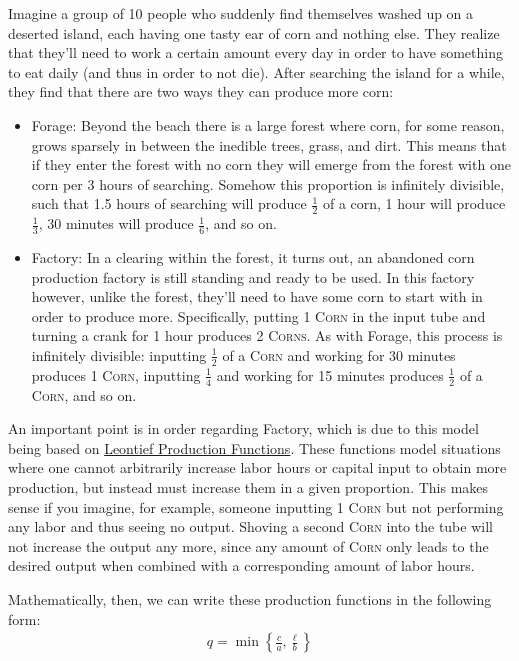\documentclass[12pt]{article}
\newcommand{\strat}[1]{\textsf{#1}}
\newcommand{\Corn}[1]{\textsc{Corn#1}}
\begin{document}
Imagine a group of 10 people who suddenly find themselves washed up on a deserted island, each having one tasty ear of corn and nothing else. They realize that they'll need to work a certain amount every day in order to have something to eat daily (and thus in order to not die). After searching the island for a while, they find that there are two ways they can produce more corn:
\begin{itemize}
    \item \textsf{Forage}: Beyond the beach there is a large forest where corn, for some reason, grows sparsely in between the inedible trees, grass, and dirt. This means that if they enter the forest with no corn they will emerge from the forest with one corn per 3 hours of searching. Somehow this proportion is infinitely divisible, such that 1.5 hours of searching will produce $\frac{1}{2}$ of a corn, 1 hour will produce $\frac{1}{3}$, 30 minutes will produce $\frac{1}{6}$, and so on.
    \item \textsf{Factory}: In a clearing within the forest, it turns out, an abandoned corn production factory is still standing and ready to be used. In this factory however, unlike the forest, they'll need to have some corn to start with in order to produce more. Specifically, putting 1 \Corn{} in the input tube and turning a crank for 1 hour produces 2 \Corn{s}. As with \strat{Forage}, this process is infinitely divisible: inputting $\frac{1}{2}$ of a \Corn{} and working for 30 minutes produces 1 \Corn{}, inputting $\frac{1}{4}$ and working for 15 minutes produces $\frac{1}{2}$ of a \Corn{}, and so on.
\end{itemize}

An important point is in order regarding \strat{Factory}, which is due to this model being based on \href{https://en.wikipedia.org/wiki/Leontief\_production\_function}{Leontief Production Functions}. These functions model situations where one cannot arbitrarily increase labor hours or capital input to obtain more production, but instead must increase them in a given proportion. This makes sense if you imagine, for example, someone inputting 1 \Corn{} but not performing any labor and thus seeing no output. Shoving a second \Corn{} into the tube will not increase the output any more, since any amount of \Corn{} only leads to the desired output when combined with a corresponding amount of labor hours.

Mathematically, then, we can write these production functions in the following form:
\begin{align*}
q = \min{\left\{\frac{c}{a},\frac{\ell}{b}\right\}}
\end{align*}
\end{document}
